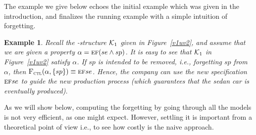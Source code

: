 \documentclass{article}
\newtheorem{example}{Example}
\begin{document}
The example we give below echoes the initial example which was given in the introduction, and finalizes the running example with a simple intuition of forgetting.
\begin{example}\label{ex:6}
Recall the \MPK-structure ${\cal K}_1$  given in Figure~\ref{v1uv2}, and assume that we are given a property $\alpha = \textsc{e}\textsc{f}(se \wedge sp)$. It is easy to see that ${\cal K}_1$ in Figure~\ref{v1uv2} satisfy $\alpha$. If $sp$ is intended to be removed, i.e., forgetting  $sp$ from $\alpha$,  then  ${\textsc{F}_{\textsc{ctl}}}(\alpha,\{ sp\}) \equiv \textsc{e}\textsc{f} se$. Hence, the company can use the new specification $\textsc{e}\textsc{f} se$ to guide the new production process (which guarantees that the sedan car is eventually produced).
\end{example}



As we will show below, computing the forgetting by going through all the models is not very efficient, as one might expect. However, settling it is important from a theoretical point of view i.e., to see how costly is the naive approach.
\end{document}
